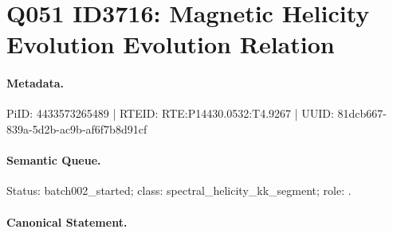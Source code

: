 \section*{Q051 ID3716: Magnetic Helicity Evolution Evolution Relation}
\paragraph{Metadata.}
PiID: 4433573265489 | RTEID: RTE:P14430.0532:T4.9267 | UUID: 81dcb667-839a-5d2b-ac9b-af6f7b8d91cf

\paragraph{Semantic Queue.}
Status: batch002\_started; class: spectral\_helicity\_kk\_segment; role: .

\paragraph{Canonical Statement.}
